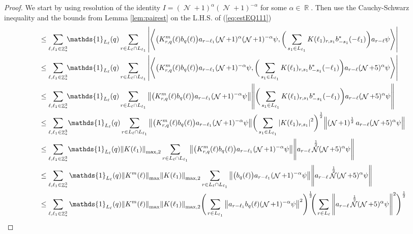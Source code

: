 \documentclass[sn-mathphys, Numbered ,a4paper]{sn-jnl}%
\DeclareMathOperator{\R}{\mathbb{R}}
\DeclareMathOperator{\Z}{\mathbb{Z}}
\DeclareMathOperator{\NN}{\mathcal{N}}
\newcommand{\half}{\frac{1}{2}}
\newcommand{\eva}[1]{\left\langle #1 \right\rangle}
\theoremstyle{plain}
\theoremstyle{definition}
\theoremstyle{remark}
\theoremstyle{plain}
\theoremstyle{definition}
\theoremstyle{remark}
\begin{document}
\begin{proof}
We start by using resolution of the identity $I = (\NN+1)^{\alpha}(\NN+1)^{-\alpha}$ for some $\alpha \in \R$. Then use the Cauchy-Schwarz inequality and the bounds from Lemma \ref{lem:pairest} on the L.H.S. of (\ref{eq:estEQ111})
\begin{align}
    &\leq \sum\limits_{\ell,\ell_1 \in \Z^3_*}\!\! \mathds{1}_{L_\ell}(q) \sum\limits_{r \in L_\ell \cap L_{\ell_1}}\abs{\eva{\big(K^{m}_{r,q}(\ell)b_{q}(\ell)\big) a_{r-\ell_1}(\NN+1)^{\alpha}(\NN+1)^{-\alpha} \psi, \bigg( \sum\limits_{s_1 \in L_{\ell_1}} K(\ell_1)_{r,s_1}b^*_{-s_1}(-\ell_1) \bigg) a_{r-\ell} \psi }}\nonumber\\
    &\leq \sum\limits_{\ell,\ell_1 \in \Z^3_*} \!\!\mathds{1}_{L_\ell}(q) \sum\limits_{r \in L_\ell \cap L_{\ell_1}}\abs{\eva{\big(K^{m}_{r,q}(\ell)b_{q}(\ell)\big) a_{r-\ell_1}(\NN+1)^{-\alpha} \psi, \bigg( \sum\limits_{s_1 \in L_{\ell_1}} K(\ell_1)_{r,s_1}b^*_{-s_1}(-\ell_1) \bigg) a_{r-\ell}(\NN+5)^{\alpha} \psi }}\nonumber\\
    &\leq \sum\limits_{\ell,\ell_1 \in \Z^3_*} \!\!\mathds{1}_{L_\ell}(q) \sum\limits_{r \in L_\ell \cap L_{\ell_1}}\norm{\big(K^{m}_{r,q}(\ell)b_{q}(\ell)\big) a_{r-\ell_1} (\NN+1)^{-\alpha}\psi}\norm {\bigg( \sum\limits_{s_1 \in L_{\ell_1}} K(\ell_1)_{r,s_1}b^*_{-s_1}(-\ell_1) \bigg) a_{r-\ell} (\NN+5)^{\alpha}\psi }\nonumber\\
    &\leq \sum\limits_{\ell,\ell_1 \in \Z^3_*} \!\mathds{1}_{L_\ell}(q) \sum\limits_{r \in L_\ell\cap L_{\ell_1}} \norm{\big(K^{m}_{r,q}(\ell)b_{q}(\ell)\big) a_{r-\ell_1} (\NN+1)^{-\alpha} \psi}\bigg( \sum\limits_{s_1 \in L_{\ell_1}} \abs{K(\ell_1)_{r,s_1}}^2 \bigg)^\half \norm {\left(\NN+1\right)^\half a_{r-\ell} (\NN+5)^{\alpha} \psi }\nonumber\\
    &\leq \sum\limits_{\ell,\ell_1 \in \Z^3_*} \!\mathds{1}_{L_\ell}(q) \norm{K(\ell_1)}_{\mathrm{max},2} \sum\limits_{r \in L_\ell\cap L_{\ell_1}} \norm{\big(K^{m}_{r,q}(\ell)b_{q}(\ell)\big) a_{r-\ell_1} (\NN+1)^{-\alpha} \psi} \norm { a_{r-\ell}\NN^\half (\NN+5)^{\alpha} \psi }\nonumber\\
    &\leq \sum\limits_{\ell,\ell_1 \in \Z^3_*} \mathds{1}_{L_\ell}(q) \norm{K^{m}(\ell)}_{\mathrm{max}}\norm{K(\ell_1)}_{\mathrm{max},2} \sum\limits_{r \in L_\ell \cap L_{\ell_1}} \norm{\big(b_{q}(\ell)\big) a_{r-\ell_1} (\NN+1)^{-\alpha} \psi} \norm { a_{r-\ell}\NN^\half (\NN+5)^{\alpha} \psi }\nonumber\\
    &\leq \sum\limits_{\ell,\ell_1 \in \Z^3_*} \mathds{1}_{L_\ell}(q) \norm{K^{m}(\ell)}_{\mathrm{max}}\norm{K(\ell_1)}_{\mathrm{max},2} \Bigg(\sum\limits_{r \in L_{\ell_1}} \norm{ a_{r-\ell_1}b_{q}(\ell) (\NN+1)^{-\alpha} \psi}^2\Bigg)^\half\!\!\Bigg( \sum\limits_{r \in L_\ell} \norm { a_{r-\ell}\NN^\half (\NN+5)^{\alpha} \psi }^2\Bigg)^\half\nonumber\\

\end{align}
\end{proof}
\end{document}

